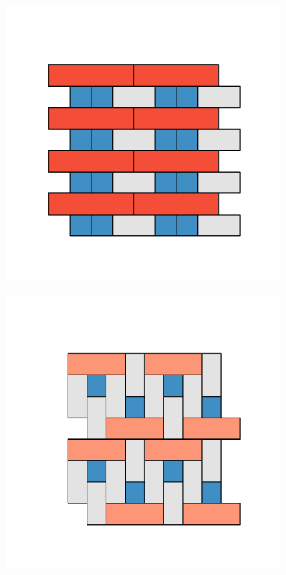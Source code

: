 \begin{figure}[bt]
      \begin{subfigure}[b]{0.16\textwidth}
         \centering
         \includegraphics[width=\textwidth]{./figures/procrystals/t2.pdf}
         \caption{}
         \label{fig:pro3pksq5}
     \end{subfigure}
  	\hfill
  	  \begin{subfigure}[b]{0.16\textwidth}
         \centering
         \includegraphics[width=\textwidth]{./figures/procrystals/t5.pdf}

\end{subfigure}
\end{figure}
